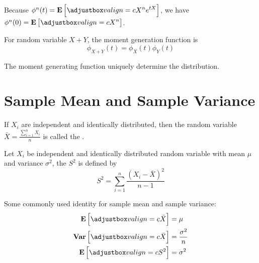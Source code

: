 Because $\phi^n (t) = \expect{X^n e^{tX}}$, we have $\phi^n(0) = \expect{X^n}$.

\begin{theorem}
    For random variable $X + Y$, the moment generation function is
    \begin{equation}
        \phi_{X+Y}(t) = \phi_X(t) \phi_Y(t)
    \end{equation}    
\end{theorem}

\begin{theorem}
The moment generating function uniquely determine the distribution.    
\end{theorem}




\section{Sample Mean and Sample Variance}


\begin{definition}
    If $X_i$ are independent and identically distributed, then the random variable $\bar{X} =\displaystyle \frac{\sum_{i=1}^n X_i}{n}$ is called the .
\end{definition}

\begin{definition}
    Let $X_i$ be independent and identically distributed random variable with mean $\mu$ and variance $\sigma^2$, the  $S^2$ is defined by 
\begin{equation}
    S^2 = \sum_{i=1}^n \displaystyle \frac{(X_i - \bar{X})^2}{n - 1}
\end{equation} 
\end{definition}



\begin{theorem}
    Some commonly used identity for sample mean and sample variance:
    \begin{equation}
        \begin{aligned}
            \expect{\bar{X}} &= \mu \\
            \variance{\bar{X}} &= \frac{\sigma^2}{n} \\
            \expect{S^2} &= \sigma^2
        \end{aligned}
    \end{equation}
\end{theorem}
    
